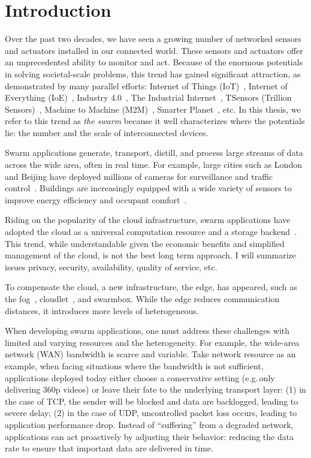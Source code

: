 \documentclass[thesis.tex]{subfiles}
\begin{document}
\chapter{Introduction}

Over the past two decades, we have seen a growing number of networked sensors
and actuators installed in our connected world. These sensors and actuators
offer an unprecedented ability to monitor and act. Because of the enormous
potentials in solving societal-scale problems, this trend has gained significant
attraction, as demonstrated by many parallel efforts: Internet of Things
(IoT)~\cite{atzori2010internet}, Internet of Everything
(IoE)~\cite{bradley2013internet}, Industry 4.0~\cite{lasi2014industry}, The
Industrial Internet~\cite{eigner2018industrial}, TSensors (Trillion
Sensors)~\cite{bogue2014towards}, Machine to Machine
(M2M)~\cite{anton2014machine}, Smarter Planet~\cite{palmisano2008smarter},
etc. In this thesis, we refer to this trend as \textit{the swarm} because it
well characterizes where the potentials lie: the number and the scale of
interconnected devices.

Swarm applications generate, transport, distill, and process large streams of
data across the wide area, often in real time. For example, large cities such as
London and Beijing have deployed millions of cameras for surveillance and
traffic control~\cite{skynet, london.surveillance}. Buildings are increasingly
equipped with a wide variety of sensors to improve energy efficiency and
occupant comfort~\cite{dawson2010smap, krioukov2012building}.

Riding on the popularity of the cloud infrastructure, swarm applications have
adopted the cloud as a universal computation resource and a storage
backend~\cite{carriots, grovestreams, sami, xively, gupta2014bolt,
  zachariah1001internet}. This trend, while understandable given the economic
benefits and simplified management of the cloud, is not the best long term
approach. I will summarize issues privacy, security, availability, quality of
service, etc.

To compensate the cloud, a new infrastructure, the edge, has appeared, such as
the fog~\cite{bonomi2012fog, bar2013fog}, cloudlet~\cite{ha2014towards,
  satyanarayanan2009case, chen2018application}, and swarmbox. While the edge
reduces communication distances, it introduces more levels of heterogeneous.

When developing swarm applications, one must address these challenges with
limited and varying resources and the heterogeneity. For example, the wide-area
network (WAN) bandwidth is scarce and variable. Take network resource as an
example, when facing situations where the bandwidth is not sufficient,
applications deployed today either choose a conservative setting (e.g.\,only
delivering 360p videos) or leave their fate to the underlying transport layer:
(1) in the case of TCP, the sender will be blocked and data are backlogged,
leading to severe delay; (2) in the case of UDP, uncontrolled packet loss
occurs, leading to application performance drop. Instead of ``suffering'' from a
degraded network, applications can act proactively by adjusting their behavior:
reducing the data rate to ensure that important data are delivered in time.
\end{document}
